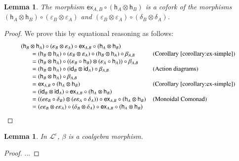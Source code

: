 \documentclass{article}
\newtheorem{lemma}[theorem]{Lemma}
\newcommand{\cat}[1]{\mathcal{#1}}
\newcommand{\id}[0]{\mathsf{id}}
\newcommand{\e}[1]{\mathsf{ex}_{#1}}
\newcommand{\h}[1]{\mathsf{h}_{#1}}
\begin{document}
\begin{lemma}
  \label{lemma:cofork-for-ex}
  The morphism $\e{A,B} \circ (\h{A} \otimes \h{B})$ is a cofork of
  the morphisms $(\h{A} \otimes \h{B}) \circ (\varepsilon_B \otimes
  \varepsilon_A)$ and $(\varepsilon_B \otimes \varepsilon_A) \circ
  (\delta_B \otimes \delta_A)$.
\end{lemma}
\begin{proof}
  We prove this by equational reasoning as follows:
  \[
  \small
  \begin{array}{lll}
    (\h{B} \otimes \h{A}) \circ (\varepsilon_B \otimes \varepsilon_A) \circ \e{A,B} \circ (\h{A} \otimes \h{B})
    \\\,\,\,\,\,\,\,\,\,\,\,
    = (\h{B} \otimes \h{A}) \circ (\varepsilon_B \otimes \varepsilon_A) \circ (\h{B} \otimes \h{A}) \circ \beta_{A,B}
    & \text{(Corollary~\ref{corollary:ex-simple})}\\
    \,\,\,\,\,\,\,\,\,\,\,= (\h{B} \otimes \h{A}) \circ ((\varepsilon_B \circ \h{B}) \otimes (\varepsilon_A \circ \h{A})) \circ \beta_{A,B}
    & \text{}\\
    \,\,\,\,\,\,\,\,\,\,\,= (\h{B} \otimes \h{A}) \circ (\id_B \otimes \id_A) \circ \beta_{A,B}
    & \text{(Action diagrams)}\\
    \,\,\,\,\,\,\,\,\,\,\,= (\h{B} \otimes \h{A}) \circ \beta_{A,B}
    & \text{}\\
    \,\,\,\,\,\,\,\,\,\,\,= \e{A,B} \circ (\h{A} \otimes \h{B})
    & \text{(Corollary~\ref{corollary:ex-simple})}\\
    \,\,\,\,\,\,\,\,\,\,\,= (\id_B \otimes \id_A) \circ \e{A,B} \circ (\h{A} \otimes \h{B})
    & \text{}\\
    \,\,\,\,\,\,\,\,\,\,\,= ((e\varepsilon_B \circ \delta_B) \otimes (e\varepsilon_A \circ \delta_A)) \circ \e{A,B} \circ (\h{A} \otimes \h{B})
    & \text{(Monoidal Comonad)}\\
    \,\,\,\,\,\,\,\,\,\,\,= (e\varepsilon_B \otimes e\varepsilon_A) \circ (\delta_B \otimes \delta_A) \circ \e{A,B} \circ (\h{A} \otimes \h{B})
    & \text{}\\
  \end{array}
  \]
\end{proof}

\begin{lemma}
  \label{lemma:beta-coalgebra-morph}
  In $\cat{L}^e$, $\beta$ is a coalgebra morphism.
\end{lemma}
\begin{proof}
  ...
\end{proof}
\end{document}
